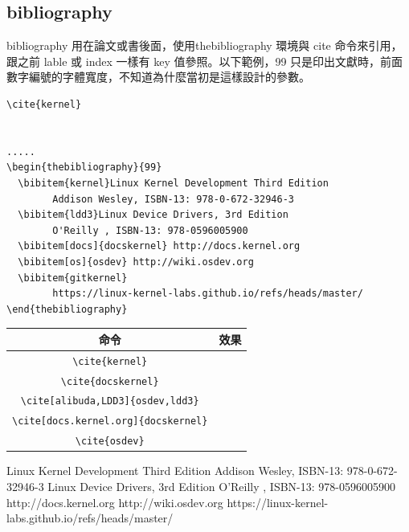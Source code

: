 \subsection{bibliography}
bibliography 用在論文或書後面，使用thebibliography 環境與 cite 命令來引用，
跟之前 lable 或 index 一樣有 key 值參照。以下範例，99 只是印出文獻時，前面
數字編號的字體寬度，不知道為什麼當初是這樣設計的參數。
\begin{verbatim}
\cite{kernel}


.....
\begin{thebibliography}{99}
  \bibitem{kernel}Linux Kernel Development Third Edition
        Addison Wesley, ISBN-13: 978-0-672-32946-3
  \bibitem{ldd3}Linux Device Drivers, 3rd Edition
        O'Reilly , ISBN-13: 978-0596005900
  \bibitem[docs]{docskernel} http://docs.kernel.org
  \bibitem[os]{osdev} http://wiki.osdev.org
  \bibitem{gitkernel}
        https://linux-kernel-labs.github.io/refs/heads/master/
\end{thebibliography}
\end{verbatim}
\begin{tabular}{cc}
命令 & 效果 \\
\hline
\verb=\cite{kernel}=& \cite{kernel} \\
\verb=\cite{docskernel}=& \cite{docskernel}\\
\verb=\cite[alibuda,LDD3]{osdev,ldd3}=& \cite[alibuda,LDD3]{osdev,ldd3}\\
\verb=\cite[docs.kernel.org]{docskernel}=& \cite[docs.kernel.org]{docskernel}\\
\verb=\cite{osdev}=& \cite{osdev}\\
\end{tabular}
\begin{thebibliography}{99}
  Linux Kernel Development Third Edition
        Addison Wesley, ISBN-13: 978-0-672-32946-3
  Linux Device Drivers, 3rd Edition
        O'Reilly , ISBN-13: 978-0596005900
   http://docs.kernel.org
   http://wiki.osdev.org
        https://linux-kernel-labs.github.io/refs/heads/master/
\end{thebibliography}

